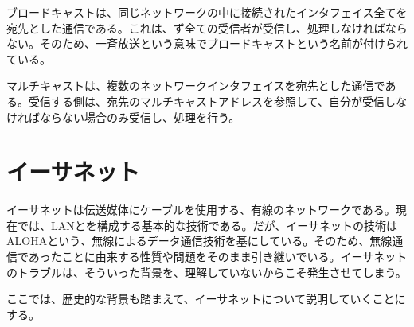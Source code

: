 ブロードキャストは、同じネットワークの中に接続されたインタフェイス全てを宛先とした通信である。これは、ず全ての受信者が受信し、処理しなければならない。そのため、一斉放送という意味でブロードキャストという名前が付けられている。

マルチキャストは、複数のネットワークインタフェイスを宛先とした通信である。受信する側は、宛先のマルチキャストアドレスを参照して、自分が受信しなければならない場合のみ受信し、処理を行う。

\section{イーサネット}

イーサネットは伝送媒体にケーブルを使用する、有線のネットワークである。現在では、LANとを構成する基本的な技術である。だが、イーサネットの技術はALOHAという、無線によるデータ通信技術を基にしている。そのため、無線通信であったことに由来する性質や問題をそのまま引き継いでいる。イーサネットのトラブルは、そういった背景を、理解していないからこそ発生させてしまう。

ここでは、歴史的な背景も踏まえて、イーサネットについて説明していくことにする。

